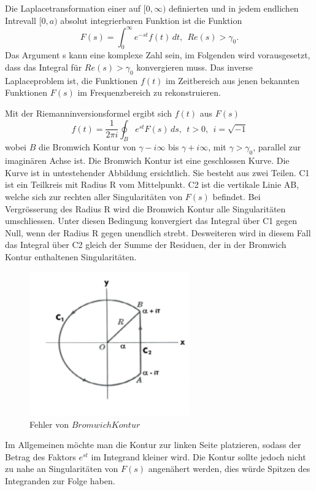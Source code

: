 %
%
%
Die Laplacetransformation einer auf $[0, \infty)$ definierten und in jedem endlichen Intrevall  $[0, a)$ absolut integrierbaren Funktion ist die Funktion
\[
F(s) = \int_0^\infty e^{-st}f(t)\,dt,~~Re(s)>\gamma_{0}.
\]
Das Argument s kann eine komplexe Zahl sein, im Folgenden wird vorausgesetzt, dass das Integral für $Re(s)>\gamma_{0}$ konvergieren muss.
Das inverse Laplaceproblem ist, die Funktionen $f(t)$ im Zeitbereich aus jenen bekannten Funktionen $F(s)$ im Frequenzbereich zu rekonstruieren.

Mit der Riemanninversionsformel ergibt sich $f(t)$ aus $F(s)$
\[
f(t) = \frac{1}{2\pi i} \oint_{B} e^{st}F(s)\,ds,~~t>0,~~i=\sqrt{-1}
\]
wobei $B$ die Bromwich Kontur von $\gamma-i\infty$ bis $\gamma+i\infty$, mit $\gamma>\gamma_{0}$, parallel zur imaginären Achse ist. Die Bromwich Kontur ist eine geschlossen Kurve. Die Kurve ist in untestehender Abbildung ersichtlich. Sie besteht aus zwei Teilen. C1 ist ein Teilkreis mit Radius R vom Mittelpunkt. C2 ist die vertikale Linie AB, welche sich zur rechten aller Singularitäten von $F(s)$ befindet.  Bei Vergrösserung des Radius R wird die Bromwich Kontur alle Singularitäten umschliessen. Unter diesen Bedingung konvergiert das Integral über C1 gegen Null, wenn der Radius R gegen unendlich strebt. Desweiteren wird in diesem Fall das Integral über C2 gleich der Summe der Residuen, der in der Bromwich Kontur enthaltenen Singularitäten.

\begin{figure}
\centering
\includegraphics[width=6.9cm]{papers/laplace/Bromwich_Contour}
\caption{Fehler von $Bromwich Kontur$
\label{laplace:bromwichkontur}
}
\end{figure}

Im Allgemeinen möchte man die Kontur zur linken Seite platzieren, sodass der Betrag des Faktors $e^{st}$ im Integrand kleiner wird.
Die Kontur sollte jedoch nicht zu nahe an Singularitäten von $F(s)$ angenähert werden, dies würde Spitzen des Integranden zur Folge haben.

